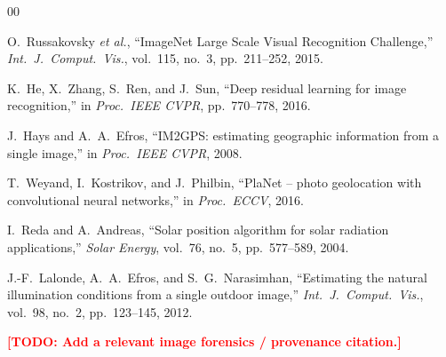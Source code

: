 \documentclass[conference]{IEEEtran}
\newcommand{\todo}[1]{\textcolor{red}{\textbf{[TODO: #1]}}}
\begin{document}
\begin{thebibliography}{00}

O.~Russakovsky \textit{et al.}, ``ImageNet Large Scale Visual Recognition
Challenge,'' \textit{Int.\ J.\ Comput.\ Vis.}, vol.~115, no.~3,
pp.~211--252, 2015.

K.~He, X.~Zhang, S.~Ren, and J.~Sun, ``Deep residual learning for image
recognition,'' in \textit{Proc.\ IEEE CVPR}, pp.~770--778, 2016.

J.~Hays and A.~A.~Efros, ``IM2GPS: estimating geographic information from a
single image,'' in \textit{Proc.\ IEEE CVPR}, 2008.

T.~Weyand, I.~Kostrikov, and J.~Philbin, ``PlaNet -- photo geolocation with
convolutional neural networks,'' in \textit{Proc.\ ECCV}, 2016.

I.~Reda and A.~Andreas, ``Solar position algorithm for solar radiation
applications,'' \textit{Solar Energy}, vol.~76, no.~5, pp.~577--589, 2004.

J.-F.~Lalonde, A.~A.~Efros, and S.~G.~Narasimhan, ``Estimating the natural
illumination conditions from a single outdoor image,'' \textit{Int.\ J.\
Comput.\ Vis.}, vol.~98, no.~2, pp.~123--145, 2012.

\todo{Add a relevant image forensics / provenance citation.}

\end{thebibliography}
\end{document}
